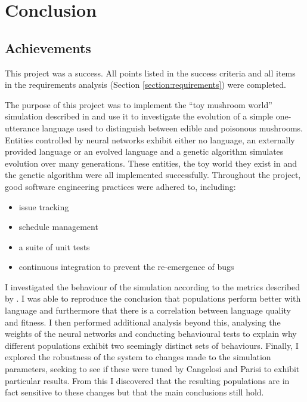 \documentclass[12pt,a4paper,twoside,openright]{report}
\begin{document}

\chapter{Conclusion}

\section{Achievements}

This project was a success. All points listed in the success criteria and all items in the requirements analysis (Section \ref{section:requirements}) were completed.

The purpose of this project was to implement the ``toy mushroom world'' simulation described in \citet{Cangelosi1998} and use it to investigate the evolution of a simple one-utterance language used to distinguish between edible and poisonous mushrooms. Entities controlled by neural networks exhibit either no language, an externally provided language or an evolved language and a genetic algorithm simulates evolution over many generations. These entities, the toy world they exist in and the genetic algorithm were all implemented successfully. Throughout the project, good software engineering practices were adhered to, including:
\begin{itemize}
    \item issue tracking
    \item schedule management
    \item a suite of unit tests
    \item continuous integration to prevent the re-emergence of bugs
\end{itemize}

I investigated the behaviour of the simulation according to the metrics described by \citet{Cangelosi1998}. I was able to reproduce the conclusion that populations perform better with language and furthermore that there is a correlation between language quality and fitness. I then performed additional analysis beyond this, analysing the weights of the neural networks and conducting behavioural tests to explain why different populations exhibit two seemingly distinct sets of behaviours. Finally, I explored the robustness of the system to changes made to the simulation parameters, seeking to see if these were tuned by Cangelosi and Parisi to exhibit particular results. From this I discovered that the resulting populations are in fact sensitive to these changes but that the main conclusions still hold.
\end{document}
